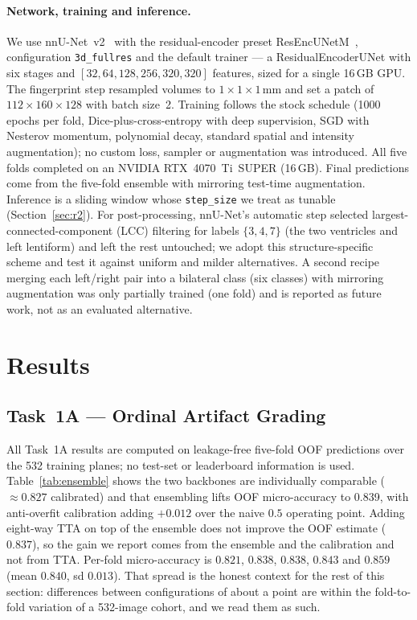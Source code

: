 \documentclass[runningheads]{llncs}
\begin{document}
\paragraph{Network, training and inference.}
We use nnU-Net~v2~\cite{isensee2021nnunet} with the residual-encoder preset
ResEncUNetM~\cite{isensee2024revisited}, configuration \texttt{3d\_fullres} and
the default trainer --- a ResidualEncoderUNet with six stages and
$[32,64,128,256,320,320]$ features, sized for a single 16\,GB GPU. The
fingerprint step resampled volumes to $1\times1\times1$\,mm and set a patch of
$112\times160\times128$ with batch size~2. Training follows the stock schedule
(1000 epochs per fold, Dice-plus-cross-entropy with deep supervision, SGD with
Nesterov momentum, polynomial decay, standard spatial and intensity
augmentation); no custom loss, sampler or augmentation was introduced. All five
folds completed on an NVIDIA RTX~4070~Ti~SUPER (16\,GB). Final predictions come
from the five-fold ensemble with mirroring test-time augmentation. Inference is a
sliding window whose \texttt{step\_size} we treat as tunable
(Section~\ref{sec:r2}). For post-processing, nnU-Net's automatic step selected
largest-connected-component (LCC) filtering for labels $\{3,4,7\}$ (the two
ventricles and left lentiform) and left the rest untouched; we adopt this
structure-specific scheme and test it against uniform and milder alternatives. A
second recipe merging each left/right pair into a bilateral class (six classes)
with mirroring augmentation was only partially trained (one fold) and is reported
as future work, not as an evaluated alternative.

\FloatBarrier
\section{Results}
\label{sec:results}

\subsection{Task~1A --- Ordinal Artifact Grading}
\label{sec:r1a}

All Task~1A results are computed on leakage-free five-fold OOF predictions over
the 532 training planes; no test-set or leaderboard information is used.
Table~\ref{tab:ensemble} shows the two backbones are individually comparable
($\approx0.827$ calibrated) and that ensembling lifts OOF micro-accuracy to 0.839,
with anti-overfit calibration adding $+0.012$ over the naive $0.5$ operating point.
Adding eight-way TTA on top of the ensemble does not improve the OOF estimate
($0.837$), so the gain we report comes from the ensemble and the calibration and not
from TTA. Per-fold micro-accuracy is $0.821$, $0.838$, $0.838$, $0.843$ and $0.859$
(mean $0.840$, sd $0.013$). That spread is the honest context for the rest of this
section: differences between configurations of about a point are within the
fold-to-fold variation of a 532-image cohort, and we read them as such.
\end{document}
